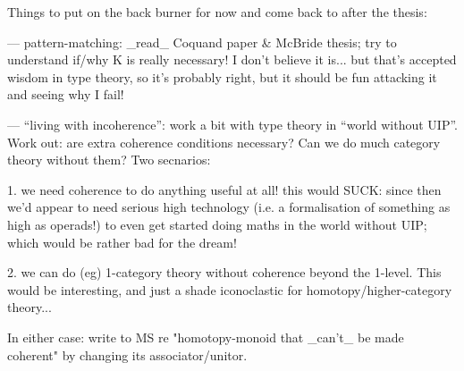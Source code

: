 Things to put on the back burner for now and come back to after the thesis:

--- pattern-matching:
_read_ Coquand paper & McBride thesis; try to understand if/why K is really necessary!  I don't believe it is... but that's accepted wisdom in type theory, so it's probably right, but it should be fun attacking it and seeing why I fail!

--- ``living with incoherence'':
work a bit with type theory in ``world without UIP''.  Work out: are extra coherence conditions necessary?  Can we do much category theory without them?  Two secnarios:

1. we need coherence to do anything useful at all!  this would SUCK: since then we'd appear to need serious high technology (i.e. a formalisation of something as high as operads!) to even get started doing maths in the world without UIP; which would be rather bad for the dream!

2. we can do (eg) 1-category theory without coherence beyond the 1-level.  This would be interesting, and just a shade iconoclastic for homotopy/higher-category theory...

In either case: write to MS re "homotopy-monoid that _can't_ be made coherent" by changing its associator/unitor.
